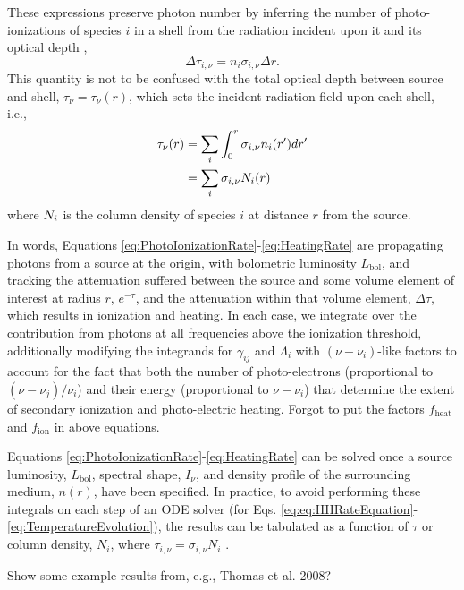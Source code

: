 These expressions preserve photon number by inferring the number of photo-ionizations of species $i$ in a shell from the radiation incident upon it and its optical depth \cite[e.g.,][]{Abel1999},
\begin{equation}
    \Delta \tau_{i,\nu} = n_i \sigma_{i,\nu} \Delta r .
\end{equation}    
This quantity is not to be confused with the total optical depth between source and shell, $\tau_{\nu} = \tau_{\nu}(r)$, which sets the incident radiation field upon each shell, i.e.,
\begin{align}
    \tau_{\nu}(r) & = \sum_i \int_0^r \sigma_{i,\nu} n_i(r^{\prime}) dr^{\prime} \nonumber \\
                  & = \sum_i \sigma_{i,\nu} N_i(r) \label{eq:OpticalDepth}
\end{align}
where $N_i$ is the column density of species $i$ at distance $r$ from the
source. 

In words, Equations \ref{eq:PhotoIonizationRate}-\ref{eq:HeatingRate} are propagating photons from a source at the origin, with bolometric luminosity $L_{\mathrm{bol}}$, and tracking the attenuation suffered between the source and some volume element of interest at radius $r$, $e^{-\tau}$, and the attenuation within that volume element, $\Delta \tau$, which results in ionization and heating. In each case, we integrate over the contribution from photons at all frequencies above the ionization threshold, additionally modifying the integrands for $\gamma_{ij}$ and $\Lambda_i$ with $(\nu - \nu_i)$-like factors to account for the fact that both the number of photo-electrons (proportional to $(\nu - \nu_j) / \nu_i$) and their energy (proportional to $\nu - \nu_i$) that determine the extent of secondary ionization and photo-electric heating. {\color{red} Forgot to put the factors $f_{\mathrm{heat}}$ and $f_{\mathrm{ion}}$ in above equations.}

Equations \ref{eq:PhotoIonizationRate}-\ref{eq:HeatingRate} can be solved once a source luminosity, $L_{\mathrm{bol}}$, spectral shape, $I_{\nu}$, and density profile of the surrounding medium, $n(r)$, have been specified. In practice, to avoid performing these integrals on each step of an ODE solver (for Eqs. \ref{eq:eq:HIIRateEquation}-\ref{eq:TemperatureEvolution}), the results can be tabulated as a function of $\tau$ or column density, $N_i$, where $\tau_{i,\nu}=\sigma_{i,\nu} N_i$ \cite{Thomas2008,Mirocha2012}.

{\color{red} Show some example results from, e.g., Thomas et al. 2008?}

